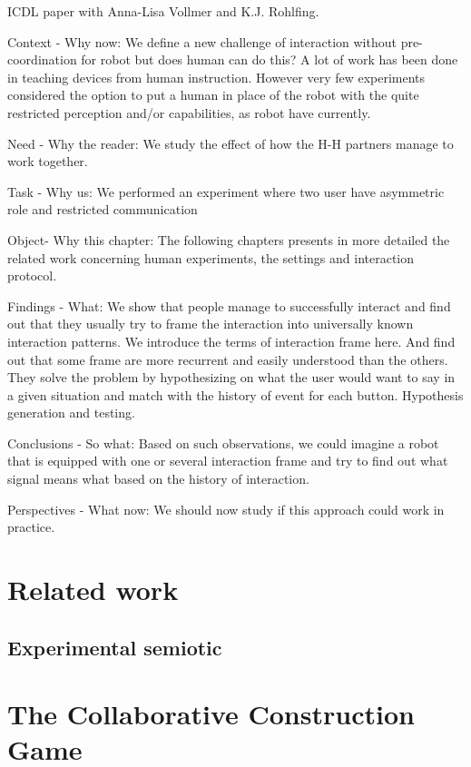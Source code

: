 ICDL paper with Anna-Lisa Vollmer and K.J. Rohlfing.

Context - Why now: We define a new challenge of interaction without pre-coordination for robot but does human can do this? A lot of work has been done in teaching devices from human instruction. However very few experiments considered the option to put a human in place of the robot with the quite restricted perception and/or capabilities, as robot have currently.

Need - Why the reader: We study the effect of how the H-H partners manage to work together.

Task - Why us: We performed an experiment where two user have asymmetric role and restricted communication

Object- Why this chapter: The following chapters presents in more detailed the related work concerning human experiments, the settings and interaction protocol.

Findings - What: We show that people manage to successfully interact and find out that they usually try to frame the interaction into universally known interaction patterns. We introduce the terms of interaction frame here. And find out that some frame are more recurrent and easily understood than the others. They solve the problem by hypothesizing on what the user would want to say in a given situation and match with the history of event for each button. Hypothesis generation and testing.

Conclusions - So what: Based on such observations, we could imagine a robot that is equipped with one or several interaction frame and try to find out what signal means what based on the history of interaction.

Perspectives - What now: We should now study if this approach could work in practice.

\section{Related work}

\subsection{Experimental semiotic}

\section{The Collaborative Construction Game}

